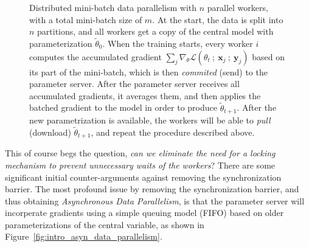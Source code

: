 \begin{figure}[H]
  \caption{Distributed mini-batch data parallelism with $n$ parallel workers, with a total mini-batch size of $m$. At the start, the data is split into $n$ partitions, and all workers get a copy of the central model with parameterization $\tilde{\theta}_0$. When the training starts, every worker $i$ computes the accumulated gradient $\sum_j \nabla_\theta \mathcal{L}(\theta_t~;~\textbf{x}_j~;~\textbf{y}_j)$ based on its part of the mini-batch, which is then \emph{commited} (send) to the parameter server. After the parameter server receives all accumulated gradients, it averages them, and then applies the batched gradient to the model in order to produce $\tilde{\theta}_{t+1}$. After the new parametrization is available, the workers will be able to \emph{pull} (download) $\tilde{\theta}_{t+1}$, and repeat the procedure described above.}
  \label{fig:distributed_mini_batch_parallelism}
\end{figure}

This of course begs the question, \emph{can we eliminate the need for a locking mechanism to prevent unnecessary waits of the workers}? There are some significant initial counter-arguments against removing the synchronization barrier. The most profound issue by removing the synchronization barrier, and thus obtaining \emph{Asynchronous Data Parallelism}, is that the parameter server will incorperate gradients using a simple queuing model (FIFO) based on older parameterizations of the central variable, as shown in Figure~\ref{fig:intro_asyn_data_parallelism}.

